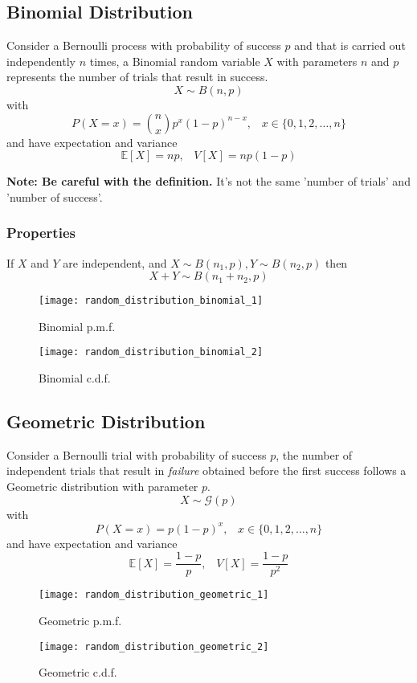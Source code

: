 \subsection{Binomial Distribution}
Consider a Bernoulli process with probability of success $p$ and that is carried out independently $n$ times, a Binomial random variable 
$X$ with parameters $n$ and $p$ represents the number of trials that result in success.
\[ X \sim B(n, p) \]
with
\[ P(X=x) = \binom{n}{x}p^x(1-p)^{n-x},\;\;\; x \in \{0,1,2,\dots,n\} \]
and have expectation and variance
\[ \mathbb{E}[X] = np,\;\;\; V[X] = np(1-p) \]

\textbf{Note: Be careful with the definition.} It's not the same 'number of trials' and 'number of success'.


\subsubsection{Properties}
If $X$ and $Y$ are independent, and $X \sim B(n_1, p), Y \sim B(n_2, p)$ then 
\[ X+Y \sim B(n_1+n_2, p) \]

\begin{figure}[!ht]
    \begin{minipage}{0.45\linewidth}
      \texttt{[image: random\_distribution\_binomial\_1]}
      \caption{Binomial p.m.f.}
    \end{minipage}
    \hfill
    \begin{minipage}{0.45\linewidth}
      \texttt{[image: random\_distribution\_binomial\_2]}
      \caption{Binomial c.d.f.}
    \end{minipage}
\end{figure}

\subsection{Geometric Distribution}
Consider a Bernoulli trial with probability of success $p$, the number of independent trials that result in \textit{failure} obtained before 
the first success follows a Geometric distribution with parameter $p$.
\[ X \sim \mathcal{G}(p)\]
with
\[ P(X=x) = p(1-p)^x,\;\;\; x \in \{0,1,2,\dots,n\} \]
and have expectation and variance
\[ \mathbb{E}[X] = \frac{1-p}{p},\;\;\; V[X] = \frac{1-p}{p^2} \]

\begin{figure}[!ht]
    \begin{minipage}{0.45\linewidth}
      \texttt{[image: random\_distribution\_geometric\_1]}
      \caption{Geometric p.m.f.}
    \end{minipage}
    \hfill
    \begin{minipage}{0.45\linewidth}
      \texttt{[image: random\_distribution\_geometric\_2]}
      \caption{Geometric c.d.f.}
    \end{minipage}
\end{figure}

